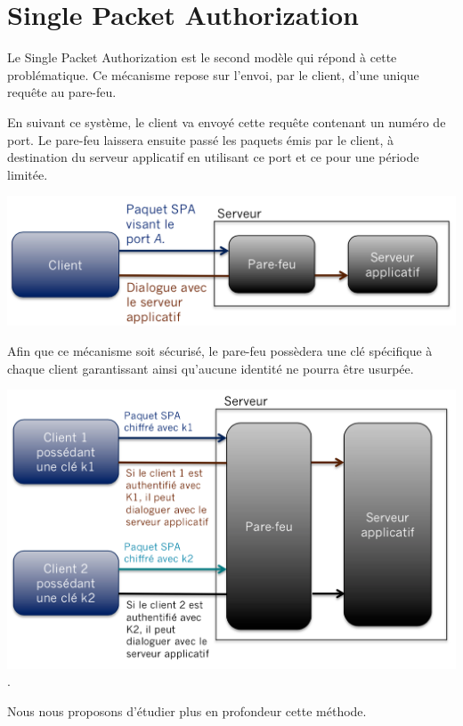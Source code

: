 \chapter{Single Packet Authorization}

Le Single Packet Authorization est le second modèle qui répond à cette problématique. Ce mécanisme repose sur l'envoi, par le client, d'une unique requête au pare-feu.

En suivant ce système, le client va envoyé cette requête contenant un numéro de port. Le pare-feu laissera ensuite passé les paquets émis par le client, à destination du serveur applicatif en utilisant ce port et ce pour une période limitée.

\includegraphics[scale=0.5]{spa_general_1}

Afin que ce mécanisme soit sécurisé, le pare-feu possèdera une clé spécifique à chaque client garantissant ainsi qu'aucune identité ne pourra être usurpée.

\includegraphics[scale=0.5]{spa_general_2}.

Nous nous proposons d'étudier plus en profondeur cette méthode.
